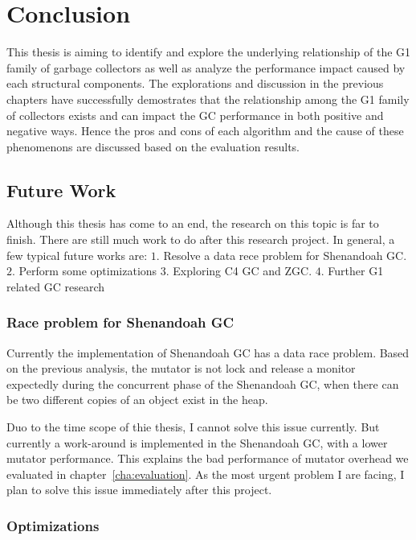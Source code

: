 \chapter{Conclusion}
\label{cha:conc}

This thesis is aiming to identify and explore the underlying relationship of the
G1 family of garbage collectors as well as analyze the performance impact caused by
each structural components.
The explorations and discussion in the previous chapters have successfully demostrates
that the relationship among the G1 family of collectors exists and can impact the GC
performance in both positive and negative ways.
Hence the pros and cons of each algorithm and the cause of these phenomenons
are discussed based on the evaluation results.

\section{Future Work}
\label{sec:future}

Although this thesis has come to an end, the research on this topic is far to finish.
There are still much work to do after this research project.
In general, a few typical future works are:
$1.$ Resolve a data rece problem for Shenandoah GC.
$2.$ Perform some optimizations
$3.$ Exploring C4 GC and ZGC.
$4.$ Further G1 related GC research

\subsection{Race problem for Shenandoah GC}

Currently the implementation of Shenandoah GC has a data race problem.
Based on the previous analysis, the mutator is not lock and release a monitor
expectedly during the concurrent phase of the Shenandoah GC, when there can be
two different copies of an object exist in the heap.

Duo to the time scope of thie thesis, I cannot solve this issue currently.
But currently a work-around is implemented in the Shenandoah GC, with a lower mutator performance.
This explains the bad performance of mutator overhead we evaluated in chapter~\ref{cha:evaluation}.
As the most urgent problem I are facing, I plan to solve this issue immediately after
this project.

\subsection{Optimizations}

